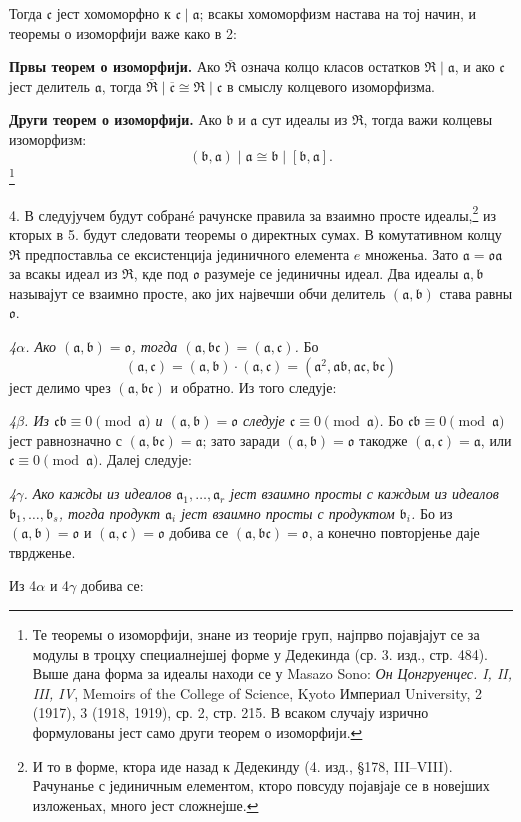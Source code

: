 \documentclass[11pt]{article}
\providecommand{\mR}{\mathfrak{R}}
\providecommand{\ma}{\mathfrak{a}}
\providecommand{\mb}{\mathfrak{b}}
\providecommand{\mc}{\mathfrak{c}}
\providecommand{\mo}{\mathfrak{o}}
\begin{document}
Тогда $\mc$ јест хомоморфно к $\mc\mid\ma$; всакы хомоморфизм настава на тој начин, и теоремы о изоморфији важе како в 2:

\textbf{Првы теорем о изоморфији.} Ако $\overline{\mR}$ означа колцо класов остатков $\mR\mid\ma$, и ако $\mc$ јест делитель $\ma$, тогда $\overline{\mR}\mid\overline{\mc}\cong\mR\mid\mc$ в смыслу колцевого изоморфизма.

\textbf{Други теорем о изоморфији.} Ако $\mb$ и $\ma$ сут идеалы из $\mR$, тогда важи колцевы изоморфизм:
\[
(\mb,\ma)\mid\ma\cong\mb\mid[\mb,\ma].
\]\footnote{Те теоремы о изоморфији, знане из теорије груп, најпрво појавјајут се за модулы в троцху специалнејшеј форме у Дедекинда (ср. 3. изд., стр. 484). Выше дана форма за идеалы находи се у Masazo Sono: \emph{Он Цонгруенцес. I, II, III, IV}, Memoirs of the College of Science, Kyoto Империал University, 2 (1917), 3 (1918, 1919), ср. 2, стр. 215. В всаком случају изрично формулованы јест само други теорем о изоморфији.}

4. В следујучем будут собранé рачунске правила за взаимно просте идеалы,\footnote{И то в форме, ктора иде назад к Дедекинду (4. изд., §178, III--VIII). Рачунанье с јединичным елементом, кторо повсуду појавјаје се в новејших изложеньах, много јест сложнејше.} из кторых в 5. будут следовати теоремы о директных сумах. В комутативном колцу $\mR$ предпоставльа се ексистенција јединичного елемента $e$ множеньа. Зато $\ma=\mo\ma$ за всакы идеал из $\mR$, кде под $\mo$ разумеје се јединичны идеал. Два идеалы $\ma,\mb$ называјут се взаимно просте, ако јих највечши обчи делитель $(\ma,\mb)$ става равны $\mo$.

\emph{4$\alpha$. Ако $(\ma,\mb)=\mo$, тогда $(\ma,\mb\mc)=(\ma,\mc)$.} Бо
\[
(\ma,\mc)=(\ma,\mb)\cdot(\ma,\mc)=(\ma^2,\ma\mb,\ma\mc,\mb\mc)
\]
јест делимо чрез $(\ma,\mb\mc)$ и обратно. Из того следује:

\emph{4$\beta$. Из $\mc\mb\equiv0\pmod{\ma}$ и $(\ma,\mb)=\mo$ следује $\mc\equiv0\pmod{\ma}$.} Бо $\mc\mb\equiv0\pmod{\ma}$ јест равнозначно с $(\ma,\mb\mc)=\ma$; зато заради $(\ma,\mb)=\mo$ такодже $(\ma,\mc)=\ma$, или $\mc\equiv0\pmod{\ma}$. Далеј следује:

\emph{4$\gamma$. Ако кажды из идеалов $\ma_1,\ldots,\ma_r$ јест взаимно просты с каждым из идеалов $\mb_1,\ldots,\mb_s$, тогда продукт $\ma_i$ јест взаимно просты с продуктом $\mb_i$.} Бо из $(\ma,\mb)=\mo$ и $(\ma,\mc)=\mo$ добива се $(\ma,\mb\mc)=\mo$, а конечно повторјенье даје тврдженье.

Из 4$\alpha$ и 4$\gamma$ добива се:
\end{document}

